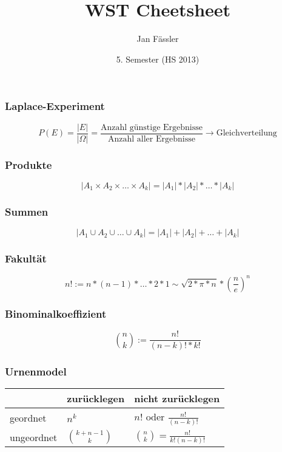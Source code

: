 \documentclass[landscape,twocolumn,a4paper]{article}
\title{
	\vspace{5cm}
	WST Cheetsheet
}
\author{ Jan Fässler}
\date{5. Semester (HS 2013)}
\begin{document}
\subsubsection*{Laplace-Experiment}
\begin{equation*}
  P(E)=\frac{|E|}{|\Omega|}=\frac{\text{Anzahl günstige Ergebnisse}}{\text{Anzahl aller Ergebnisse}} \rightarrow \text{Gleichverteilung}
\end{equation*}
\subsubsection*{Produkte}
\begin{equation*}
  |A_1 \times A_2 \times \dots \times A_k| = |A_1| * |A_2| * \dots * |A_k|
\end{equation*}
\subsubsection*{Summen}
\begin{equation*}
  |A_1 \cup A_2 \cup \dots \cup A_k| = |A_1| + |A_2| + \dots + |A_k|
\end{equation*}
\subsubsection*{Fakultät}
\begin{equation*}
	n! := n*(n-1)* \dots *2*1 \sim \sqrt{2*\pi*n}*(\frac{n}{e})^n
\end{equation*}

\subsubsection*{Binominalkoeffizient}

\begin{equation*}
	 \binom{n}{k} := \frac{n!}{(n-k)!*k!}
\end{equation*}

\subsubsection*{Urnenmodel}
\begin{center}
	\begin{tabular}{l|l|l}
		 					&	zur\"{u}cklegen			&	nicht zur\"{u}cklegen\\
		 \hline
		 geordnet		&	$n^k$							&	$n!$ oder $\frac{n!}{(n-k)!}$\\
		 \hline
		 ungeordnet	&	$\binom{k+n-1}{k}$	&	$\binom{n}{k}=\frac{n!}{k!(n-k)!}$
	\end{tabular}
\end{center}
\end{document}
